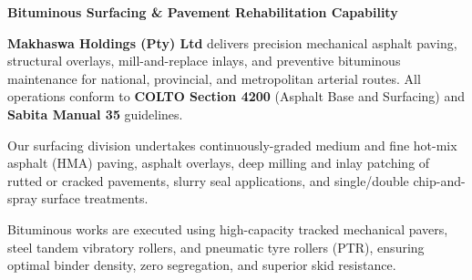 \documentclass[a4paper,11pt]{article}
\begin{document}
\noindent
\begin{minipage}[t]{0.62\textwidth}
    \vspace{0pt}
    {\large\bfseries\color{mhnavy} Bituminous Surfacing \& Pavement Rehabilitation Capability}
    \vspace{0.12cm}

    {\fontsize{9pt}{13pt}\selectfont\color{mhtext}
    \textbf{Makhaswa Holdings (Pty) Ltd} delivers precision mechanical asphalt paving, structural overlays, mill-and-replace inlays, and preventive bituminous maintenance for national, provincial, and metropolitan arterial routes. All operations conform to \textbf{COLTO Section 4200} (Asphalt Base and Surfacing) and \textbf{Sabita Manual 35} guidelines.
    }

    \vspace{0.22cm}

    {\fontsize{9pt}{13pt}\selectfont\color{mhtext}
    Our surfacing division undertakes continuously-graded medium and fine hot-mix asphalt (HMA) paving, asphalt overlays, deep milling and inlay patching of rutted or cracked pavements, slurry seal applications, and single/double chip-and-spray surface treatments.
    }

    \vspace{0.22cm}

    {\fontsize{9pt}{13pt}\selectfont\color{mhtext}
    Bituminous works are executed using high-capacity tracked mechanical pavers, steel tandem vibratory rollers, and pneumatic tyre rollers (PTR), ensuring optimal binder density, zero segregation, and superior skid resistance.
    }
\end{minipage}
\hfill
\end{document}
